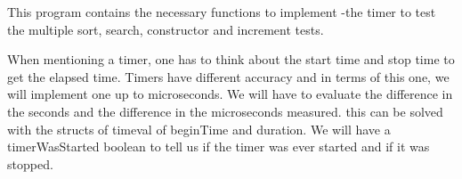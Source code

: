This program contains the necessary functions to implement -\/the timer to test the multiple sort, search, constructor and increment tests.

When mentioning a timer, one has to think about the start time and stop time to get the elapsed time. Timers have different accuracy and in terms of this one, we will implement one up to microseconds. We will have to evaluate the difference in the seconds and the difference in the microseconds measured. this can be solved with the structs of timeval of begin\+Time and duration. We will have a timer\+Was\+Started boolean to tell us if the timer was ever started and if it was stopped. 